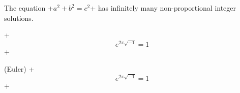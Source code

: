 \begin{theorem}
The equation +$a^2 + b^2  = c^2$+
has infinitely many non-proportional
integer solutions.
\end{theorem}

\begin{theorem}
+\[
e^{2\pi\sqrt{-1}} = 1
\]+
\end{theorem}

\begin{theorem}
{\rm (Euler) }+\[
e^{2\pi\sqrt{-1}} = 1
\]+
\end{theorem}
